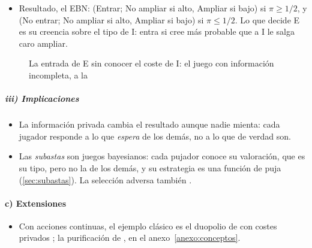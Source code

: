 \documentclass[11pt]{article}
\begin{document}
\begin{itemize}
\begin{itemize}
\begin{itemize}
    \item con probabilidad $\pi$, \textup{I} es de coste alto, no amplía y entrar le da 1;
    \item con probabilidad $1-\pi$, \textup{I} es de coste bajo, amplía y entrar le da $-1$;
    \item en promedio, entrar le da $\pi\cdot1+(1-\pi)(-1)=2\pi-1$, y quedarse fuera, 0.
    \end{itemize}
  \item Resultado, el EBN: (Entrar; No ampliar si alto, Ampliar si bajo) si $\pi\geq1/2$, y (No entrar; No ampliar si alto, Ampliar si bajo) si $\pi\leq1/2$. Lo que decide E es su creencia sobre el tipo de \textup{I}: entra si cree más probable que a \textup{I} le salga caro ampliar.
  \end{itemize}
\end{itemize}

\begin{figure}[H]
\centering
\caption{La entrada de E sin conocer el coste de \textup{I}: el juego con información incompleta, a la }\label{fig:arbol-harsanyi}
\end{figure}

\subparagraph{iii) Implicaciones}

\begin{itemize}
\item La información privada cambia el resultado aunque nadie mienta: cada jugador responde a lo que \emph{espera} de los demás, no a lo que de verdad son.
\item Las \emph{subastas} son juegos bayesianos: cada pujador conoce su valoración, que es su tipo, pero no la de los demás, y su estrategia es una función de puja (\ref{sec:subastas}). La selección adversa también .
\end{itemize}

\paragraph{c) Extensiones}

\begin{itemize}
\item Con acciones continuas, el ejemplo clásico es el duopolio de  con costes privados ; la purificación de , en el anexo~\ref{anexo:conceptos}.
\end{itemize}
\end{document}

